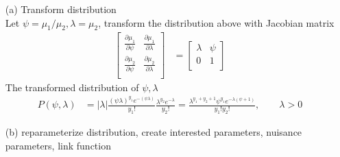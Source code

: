 \documentclass{article}
\begin{document}
\begin{itemize}
    \item [(a)] Transform distribution\\
    Let $\psi = \mu_1/\mu_2, \lambda = \mu_2$, transform the distribution above with Jacobian matrix
\begin{align*}
\begin{bmatrix}
            \frac{\partial \mu_1}{\partial \psi} & \frac{\partial \mu_1}{\partial \lambda}\\
           \frac{\partial \mu_2}{\partial \psi} & \frac{\partial \mu_2}{\partial \lambda}\\
         \end{bmatrix} &= \begin{bmatrix}
            \lambda & \psi\\
            0 & 1\\
         \end{bmatrix}
\end{align*}
The transformed distribution of $\psi, \lambda$
\begin{align*}
P(\psi, \lambda) &= |\lambda| \frac{(\psi \lambda)^{y_1} e^{-(\psi \lambda)}}{y_1!} \frac{\lambda^{y_2} e^{-\lambda}}{y_2!} = \frac{\lambda^{y_1+y_2+1} \psi^{y_1} e^{-\lambda(\psi+1)}}{y_1!y_2!}, \qquad \lambda > 0
\end{align*}
\item[(b)] reparameterize distribution, create interested parameters, nuisance parameters, link function\\

\end{itemize}

\end{document}
